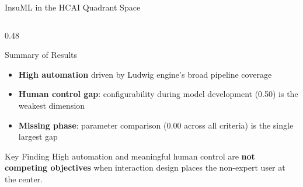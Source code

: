 \documentclass[aspectratio=169,10pt,english,dvipsnames]{beamer}
\begin{document}
\begin{frame}{InsuML in the HCAI Quadrant Space}
\begin{columns}[T]
\begin{column}{0.48\textwidth}
\begin{block}{Summary of Results}
\begin{itemize}
          \item \textbf{High automation} driven by Ludwig engine's
                broad pipeline coverage
          \item \textbf{Human control gap}: configurability during
                model development (0.50) is the weakest dimension
          \item \textbf{Missing phase}: parameter comparison (0.00
                across all criteria) is the single largest gap
        \end{itemize}
      \end{block}
      \vspace{2mm}
      \begin{exampleblock}{Key Finding}\scriptsize
        High automation and meaningful human control are \textbf{not
        competing objectives} when interaction design places the
        non-expert user at the center.
      \end{exampleblock}
    \end{column}
  \end{columns}
\end{frame}

\end{document}
